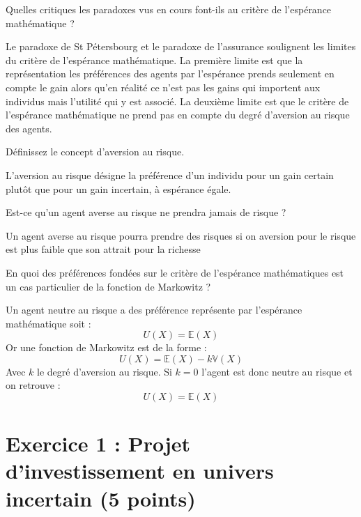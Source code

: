 \documentclass[12pt, a4paper]{exam}
\begin{document}
\begin{questions}
\question[1,25] Quelles critiques les paradoxes vus en cours font-ils au critère de l'espérance mathématique ?
\end{questions}
\begin{solutionbox}{4cm}
Le paradoxe de St Pétersbourg et le paradoxe de l'assurance soulignent les limites du critère de l'espérance mathématique. La première limite est que la représentation les préférences des agents par l'espérance  prends seulement en compte le gain alors qu'en réalité ce n'est pas les gains qui importent aux individus mais l'utilité qui y est associé. La deuxième limite est que le critère de l'espérance mathématique ne prend pas en compte du degré d'aversion au risque des agents.
\end{solutionbox}
\begin{questions}
\question[1,25] Définissez le concept d'aversion au risque.
\end{questions}
\begin{solutionbox}{3cm}
L'aversion au risque désigne la préférence d'un individu pour un gain certain plutôt que pour un gain incertain, à espérance égale. 
\end{solutionbox}	
\begin{questions}
\question[1,25] Est-ce qu'un agent averse au risque ne prendra jamais de risque ?
\end{questions}
\begin{solutionbox}{3cm}
Un agent averse au risque pourra prendre des risques si on aversion pour le risque est plus faible que son attrait pour la richesse
\end{solutionbox}	
\newpage
\begin{questions}
\question[1,25] En quoi des préférences fondées sur le critère de l'espérance mathématiques est un cas particulier de la fonction de Markowitz ?
\end{questions}
\begin{solutionbox}{6cm}
Un agent neutre au risque a des préférence représente par l'espérance mathématique soit : \[ U(X)=\mathbb{E}(X) \] Or une fonction de Markowitz est de la forme : \[ U(X)=\mathbb{E}(X)-k\mathbb{V}(X) \] Avec \( k \) le degré d'aversion au risque. Si \( k = 0 \) l'agent est donc neutre au risque et on retrouve : \[ U(X)=\mathbb{E}(X) \]
\end{solutionbox}

\section*{Exercice 1 : Projet d'investissement en univers incertain (5 points)}
\end{document}
